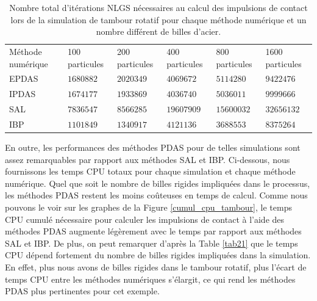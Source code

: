 \begin{table}[!h]
\begin{tabular}{|p{2cm}|p{1.75cm}|p{1.75cm}|p{1.75cm}|p{1.9cm}|p{1.9cm}|}
  \hline \rowcolor{lightgray}
  \multicolumn{6}{|c|}{Nombre total d'itérations NLGS} \\
  \hline \rowcolor{lightgray}
  Méthode numérique & 100 particules & 200 particules & 400 particules & 800 particules & 1600 particules \\ 
  \hline  EPDAS & $1680882$ & $2020349$ & $4069672$ & $5114280$ & $9422476$\\
  IPDAS & $1674177$ & $1933869$ & $4036740$ & $5036011$ & $9999666$\\
  SAL & $7836547$ & $8566285$ & $19607909$ & $15600032$ & $32656132$\\
  IBP & $1101849$ & $1340917$ & $4121136$ & $3688553$ & $8375264$\\ 
 \hline
\end{tabular}
 \caption{Nombre total d'itérations NLGS nécessaires au calcul des impulsions de contact lors de la simulation de tambour rotatif pour chaque méthode numérique et un nombre différent de billes d'acier.}\label{tab20}
\end{table}

En outre, les performances des méthodes PDAS pour de telles simulations sont assez remarquables par rapport aux méthodes SAL et IBP. Ci-dessous, nous fournissons les temps CPU totaux pour chaque simulation et chaque méthode numérique. Quel que soit le nombre de billes rigides impliquées dans le processus, les méthodes PDAS restent les moins coûteuses en temps de calcul. Comme nous pouvons le voir sur les graphes de la Figure \ref{cumul_cpu_tambour}, le temps CPU cumulé nécessaire pour calculer les impulsions de contact à l'aide des méthodes PDAS augmente légèrement avec le temps par rapport aux méthodes SAL et IBP. De plus, on peut remarquer d'après la Table \ref{tab21} que le temps CPU dépend fortement du nombre de billes rigides impliquées dans la simulation. En effet, plus nous avons de billes rigides dans le tambour rotatif, plus l'écart de temps CPU entre les méthodes numériques s'élargit, ce qui rend les méthodes PDAS plus pertinentes pour cet exemple.\\


